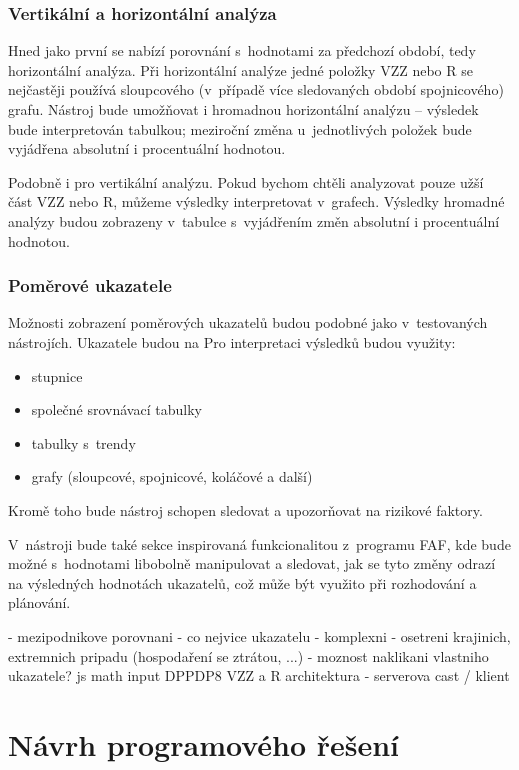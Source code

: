 \subsubsection{Vertikální a horizontální analýza}
Hned jako první se nabízí porovnání s~hodnotami za předchozí období, tedy horizontální analýza. Při horizontální analýze jedné položky VZZ nebo R se nejčastěji používá sloupcového (v~případě více sledovaných období spojnicového) grafu. Nástroj bude umožňovat i hromadnou horizontální analýzu -- výsledek bude interpretován tabulkou; meziroční změna u~jednotlivých položek bude vyjádřena absolutní i procentuální hodnotou. 

Podobně i pro vertikální analýzu. Pokud bychom chtěli analyzovat pouze užší část VZZ nebo R, můžeme výsledky interpretovat v~grafech. Výsledky hromadné analýzy budou zobrazeny v~tabulce s~vyjádřením změn absolutní i procentuální hodnotou.

\subsubsection{Poměrové ukazatele}
Možnosti zobrazení poměrových ukazatelů budou podobné jako v~testovaných nástrojích. Ukazatele budou na
Pro interpretaci výsledků budou využity:
\begin{itemize}
	\item stupnice
	\item společné srovnávací tabulky
	\item tabulky s~trendy
	\item grafy (sloupcové, spojnicové, koláčové a další)
\end{itemize}

Kromě toho bude nástroj schopen sledovat a upozorňovat na rizikové faktory. 

V~nástroji bude také sekce  inspirovaná funkcionalitou z~programu FAF, kde bude možné s~hodnotami libobolně manipulovat a sledovat, jak se tyto změny odrazí na výsledných hodnotách ukazatelů, což může být využito při rozhodování a plánování.


- mezipodnikove porovnani
- co nejvice ukazatelu - komplexni
- osetreni krajinich, extremnich pripadu (hospodaření se ztrátou, ...)
- moznost naklikani vlastniho ukazatele? js math input
DPPDP8
VZZ a R
architektura - serverova cast / klient


\section{Návrh programového řešení}

